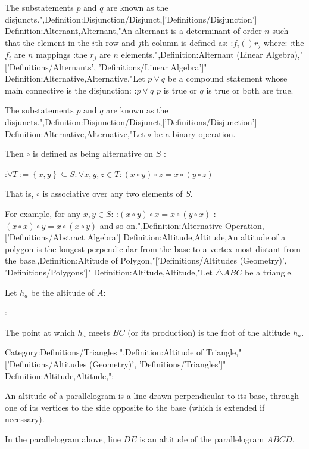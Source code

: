 The substatements $p$ and $q$ are known as the disjuncts.",Definition:Disjunction/Disjunct,['Definitions/Disjunction']
Definition:Alternant,Alternant,"An alternant is a determinant of order $n$ such that the element in the $i$th row and $j$th column is defined as:
:$f_i \left(   \right){r_j}$
where:
:the $f_i$ are $n$ mappings
:the $r_j$ are $n$ elements.",Definition:Alternant (Linear Algebra),"['Definitions/Alternants', 'Definitions/Linear Algebra']"
Definition:Alternative,Alternative,"Let $p \lor q$ be a compound statement whose main connective is the disjunction:
:$p \lor q$  $p$ is true or $q$ is true or both are true.


The substatements $p$ and $q$ are known as the disjuncts.",Definition:Disjunction/Disjunct,['Definitions/Disjunction']
Definition:Alternative,Alternative,"Let $\circ$ be a binary operation.


Then $\circ$ is defined as being alternative on $S$ :

:$\forall T := \left\lbrace x, y \right\rbrace \subseteq S: \forall x, y, z \in T: \left( x \circ y \right) \circ z = x \circ \left( y \circ z \right)$

That is, $\circ$ is associative over any two elements of $S$.


For example, for any $x, y \in S$:
:$\left( x \circ y \right) \circ x = x \circ \left( y \circ x \right)$
:$\left( x \circ x \right) \circ y = x \circ \left( x \circ y \right)$
and so on.",Definition:Alternative Operation,['Definitions/Abstract Algebra']
Definition:Altitude,Altitude,An altitude of a polygon is the longest perpendicular from the base to a vertex most distant from the base.,Definition:Altitude of Polygon,"['Definitions/Altitudes (Geometry)', 'Definitions/Polygons']"
Definition:Altitude,Altitude,"Let $\triangle ABC$ be a triangle.

Let $h_a$ be the altitude of $A$:

:


The point at which $h_a$ meets $BC$ (or its production) is the foot of the altitude $h_a$.


Category:Definitions/Triangles
",Definition:Altitude of Triangle,"['Definitions/Altitudes (Geometry)', 'Definitions/Triangles']"
Definition:Altitude,Altitude,":

An altitude of a parallelogram is a line drawn perpendicular to its base, through one of its vertices to the side opposite to the base (which is extended if necessary).

In the parallelogram above, line $DE$ is an altitude of the parallelogram $ABCD$.


